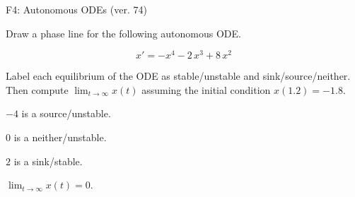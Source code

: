 \begin{exercise}
  \begin{exerciseTitle}F4: Autonomous ODEs (ver. 74)\end{exerciseTitle}
  \begin{exerciseStatement}
    

      Draw a phase line for the following 
      autonomous ODE.
    

    
\[x'= -x^{4} - 2 \, x^{3} + 8 \, x^{2}\]

    

      Label each equilibrium of the ODE
      as stable/unstable and sink/source/neither.
      Then compute \(\lim_{t\to\infty}x(t)\)
      assuming the initial condition
      \(x( 1.2 )= -1.8\).
    

  \end{exerciseStatement}
  \begin{exerciseAnswer}
    

      \(-4\) is a source/unstable.
      
        \(0\) is a neither/unstable.
      
      \(2\) is a sink/stable.
    

    

      \(\lim_{t\to\infty}x(t)=0\).
    

  \end{exerciseAnswer}
\end{exercise}